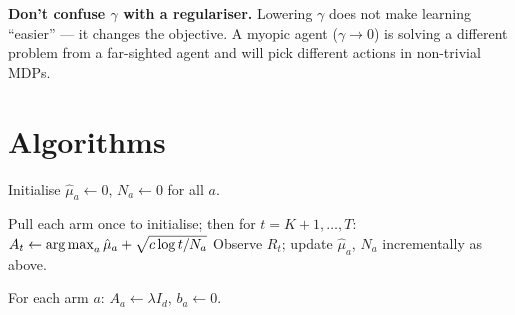 \documentclass[11pt,oneside]{scrbook}
\begin{document}
\begin{pitfall}
\textbf{Don't confuse $\gamma$ with a regulariser.} Lowering $\gamma$ does not
make learning ``easier'' --- it changes the objective. A myopic agent
(\(\gamma\)$\to 0$) is solving a different problem from a far-sighted agent and
will pick different actions in non-trivial MDPs.
\end{pitfall}

\chapter{Algorithms}
\label{ch:algos}

\begin{algorithm}[H]
\SetAlgoLined
{}
Initialise $\hat\mu_a\gets 0$, $N_a\gets 0$ for all $a$.\;
\caption{$\epsilon$-greedy bandit.}
\end{algorithm}

\begin{algorithm}[H]
\SetAlgoLined
{}
Pull each arm once to initialise; then for $t=K+1,\dots,T$:\;
$A_t \gets \operatorname*{arg\,max}_a \hat\mu_a + \sqrt{c\log t / N_a}$\;
Observe $R_t$; update $\hat\mu_a$, $N_a$ incrementally as above.\;
\caption{UCB1.}
\end{algorithm}

\begin{algorithm}[H]
\SetAlgoLined
{}
\caption{Beta-Bernoulli Thompson sampling.}
\end{algorithm}

\begin{algorithm}[H]
\SetAlgoLined
{}
For each arm $a$: $A_a\gets\lambda I_d$, $b_a\gets 0$.\;
\caption{LinUCB (disjoint arms).}
\end{algorithm}
\end{document}

